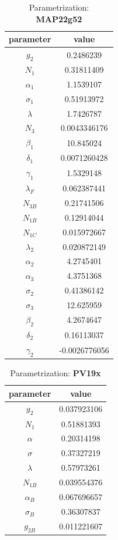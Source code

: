 \documentclass[12pt]{report}
\begin{document}
\begin{table}[h]
    \caption{Parametrization: \textbf{MAP22g52}}
    \label{tab:MAP22_real}
    \centering
   \begin{tabular}{|c|c|}
    \hline
    \textbf{parameter} & \textbf{value}\\
    \hline
    $g_2$ & 0.2486239 \\
    $N_1$ & 0.31811409 \\
    $\alpha_1$ & 1.1539107 \\
    $\sigma_1$ & 0.51913972 \\
    $\lambda$ & 1.7426787 \\
    $N_3$ & 0.0043346176 \\ 
    $\beta_1$ & 10.845024 \\ 
    $\delta_1$ & 0.0071260428 \\
    $\gamma_1$ & 1.5329148 \\
    $\lambda_F$ & 0.062387441 \\ 
    $N_{3B}$ & 0.21741506 \\
    $N_{1B}$ & 0.12914044 \\ 
    $N_{1C}$ & 0.015972667 \\
    $\lambda_2$ & 0.020872149 \\
    $\alpha_2$ & 4.2745401 \\
    $\alpha_3$ & 4.3751368 \\ 
    $\sigma_2$ & 0.41386142 \\ 
    $\sigma_3$ & 12.625959 \\ 
    $\beta_2$ & 4.2674647 \\
    $\delta_2$ & 0.16113037 \\
    $\gamma_2$ & -0.0026776056\\
    \hline
\end{tabular}
\end{table}

\begin{table}[h]
    \caption{Parametrization: \textbf{PV19x}}
    \label{tab:PV19_real}
    \centering
   \begin{tabular}{|c|c|}
    \hline
    \textbf{parameter} & \textbf{value}\\
    \hline
    $g_2$ & 0.037923106 \\
    $N_1$ & 0.51881393 \\ 
    $\alpha$ & 0.20314198 \\
    $\sigma$ & 0.37327219 \\ 
    $\lambda$ & 0.57973261 \\
    $N_{1B}$ & 0.039554376 \\ 
    $\alpha_B$ & 0.067696657 \\ 
    $\sigma_B$ & 0.36307837 \\ 
    $g_{2B}$ & 0.011221607 \\
    \hline
\end{tabular}
\end{table}
\end{document}

